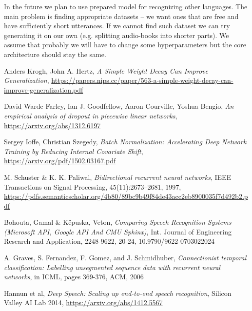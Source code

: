 \documentclass[licencjacka,en]{pracamgr}
\begin{document}
	In the future we plan to use prepared model for recognizing other languages. The main problem is finding appropriate datasets -- we want ones that are free and have sufficiently short utterances. If we cannot find such dataset we can try generating it on our own (e.g. splitting audio-books into shorter parts). We assume that probably we will have to change some hyperparameters but the core architecture should stay the same.
	
	\begin{thebibliography}{99}
		
		 Anders Krogh, John A. Hertz, \textit{A Simple Weight Decay Can Improve Generalization}, \href{https://papers.nips.cc/paper/563-a-simple-weight-decay-can-improve-generalization.pdf}{https://papers.nips.cc/paper/563-a-simple-weight-decay-can-improve-generalization.pdf}
		
		 David Warde-Farley, Ian J. Goodfellow, Aaron Courville, Yoshua Bengio, \textit{An empirical analysis of dropout in piecewise linear networks},  \href{https://arxiv.org/abs/1312.6197}{https://arxiv.org/abs/1312.6197}
		
		 Sergey Ioffe, Christian Szegedy, \textit{Batch Normalization: Accelerating Deep Network Training by Reducing Internal Covariate Shift},  \href{https://arxiv.org/pdf/1502.03167.pdf}{https://arxiv.org/pdf/1502.03167.pdf}
		
		 M. Schuster \& K. K. Paliwal, \textit{Bidirectional recurrent neural networks}, IEEE Transactions on Signal Processing, 45(11):2673–2681, 1997,  \href{https://pdfs.semanticscholar.org/4b80/89bc9b49f84de43acc2eb8900035f7d492b2.pdf}{https://pdfs.semanticscholar.org/4b80/89bc9b49f84de43acc2eb8900035f7d492b2.pdf}
		
		 Bohouta, Gamal \& Këpuska, Veton, \textit{Comparing Speech Recognition Systems (Microsoft API, Google API And CMU Sphinx)}, Int. Journal of Engineering Research and Application, 2248-9622, 20-24, 10.9790/9622-0703022024
		
		 A. Graves, S. Fernandez, F. Gomez, and J. Schmidhuber, \textit{Connectionist temporal classification:
			Labelling unsegmented sequence data with recurrent neural networks}, in ICML, pages 369-376, ACM, 2006
		
		 Hannun et al,
		\textit{Deep Speech: Scaling up end-to-end speech recognition}, Silicon Valley AI Lab 2014, \href{https://arxiv.org/abs/1412.5567}{https://arxiv.org/abs/1412.5567}
		

\end{thebibliography}
\end{document}
